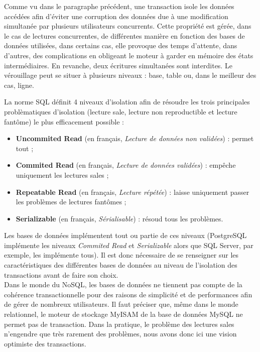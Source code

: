 	Comme vu dans le paragraphe précédent, une transaction isole les données accédées afin d'éviter une corruption des données due à une modification simultanée par plusieurs utilisateurs concurrents. Cette propriété est gérée, dans le cas de lectures concurrentes, de différentes manière en fonction des bases de données utilisées, dans certains cas, elle provoque des temps d'attente, dans d'autres, des complications en obligeant le moteur à garder en mémoire des états intermédiaires. En revanche, deux écritures simultanées sont interdites. Le vérouillage peut se situer à plusieurs niveaux : base, table ou, dans le meilleur des cas, ligne.

	La norme SQL définit 4 niveaux d'isolation afin de résoudre les trois principales problèmatiques d'isolation (lecture sale, lecture non reproductible et lecture fantôme) le plus efficacement possible :
	\vspace{10px}
	\begin{itemize}
		\item \textbf{Uncommited Read} (en français, \textit{Lecture de données non validées}) : permet tout ;
		\item \textbf{Commited Read} (en français, \textit{Lecture de données validées}) : empêche uniquement les lectures sales ;
		\item \textbf{Repeatable Read} (en français, \textit{Lecture répétée}) : laisse uniquement passer les problèmes de lectures fantômes ;
		\item \textbf{Serializable} (en français, \textit{Sérialisable}) : résoud tous les problèmes.
	\end{itemize}
	\vspace{20px}
	 Les bases de données implémentent tout ou partie de ces niveaux (PostgreSQL implémente les niveaux \textit{Commited Read} et \textit{Serializable}\cite{isolationTransactionPostgre} alors que SQL Server, par exemple, les implémente tous\cite{isolationTransactionSQLServer}). Il est donc nécessaire de se renseigner sur les caractéristiques des différentes bases de données au niveau de l'isolation des transactions avant de faire son choix.\\

	Dans le monde du NoSQL, les bases de données ne tiennent pas compte de la cohérence transactionnelle pour des raisons de simplicité et de performances afin de gérer de nombreux utilisateurs. Il faut préciser que, même dans le monde relationnel, le moteur de stockage MyISAM de la base de données MySQL ne permet pas de transaction. Dans la pratique, le problème des lectures sales n'engendre que très rarement des problèmes, nous avons donc ici une vision optimiste des transactions.
